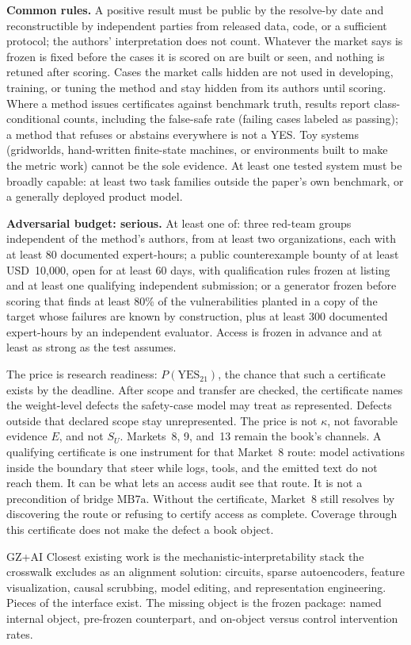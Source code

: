 \begin{predictionfineprint}
\textbf{Common rules.} A positive result must be public by the resolve-by date and reconstructible by independent parties from released data, code, or a sufficient protocol; the authors' interpretation does not count. Whatever the market says is frozen is fixed before the cases it is scored on are built or seen, and nothing is retuned after scoring. Cases the market calls hidden are not used in developing, training, or tuning the method and stay hidden from its authors until scoring. Where a method issues certificates against benchmark truth, results report class-conditional counts, including the false-safe rate (failing cases labeled as passing); a method that refuses or abstains everywhere is not a YES. Toy systems (gridworlds, hand-written finite-state machines, or environments built to make the metric work) cannot be the sole evidence. At least one tested system must be broadly capable: at least two task families outside the paper's own benchmark, or a generally deployed product model.

\textbf{Adversarial budget: serious.} At least one of: three red-team groups independent of the method's authors, from at least two organizations, each with at least 80 documented expert-hours; a public counterexample bounty of at least USD~10{,}000, open for at least 60 days, with qualification rules frozen at listing and at least one qualifying independent submission; or a generator frozen before scoring that finds at least 80\% of the vulnerabilities planted in a copy of the target whose failures are known by construction, plus at least 300 documented expert-hours by an independent evaluator. Access is frozen in advance and at least as strong as the test assumes.

The price is research readiness: $P(\mathrm{YES}_{21})$, the chance that such a certificate exists by the deadline.
After scope and transfer are checked, the certificate names the weight-level defects the safety-case model may treat as represented.
Defects outside that declared scope stay unrepresented.
The price is not $\kappa$, not favorable evidence $E$, and not $S_U$.
Markets~8, 9, and~13 remain the book's channels.
A qualifying certificate is one instrument for that Market~8 route: model activations inside the boundary that steer while logs, tools, and the emitted text do not reach them.
It can be what lets an access audit see that route.
It is not a precondition of bridge \(\text{MB7a}\).
Without the certificate, Market~8 still resolves by discovering the route or refusing to certify access as complete.
Coverage through this certificate does not make the defect a book object.
\end{predictionfineprint}
\begin{authbar}{GZ+AI}
Closest existing work is the mechanistic-interpretability stack the crosswalk excludes as an alignment solution: circuits, sparse autoencoders, feature visualization, causal scrubbing, model editing, and representation engineering.
Pieces of the interface exist.
The missing object is the frozen package: named internal object, pre-frozen counterpart, and on-object versus control intervention rates.

\end{authbar}
\authbarneedspace
